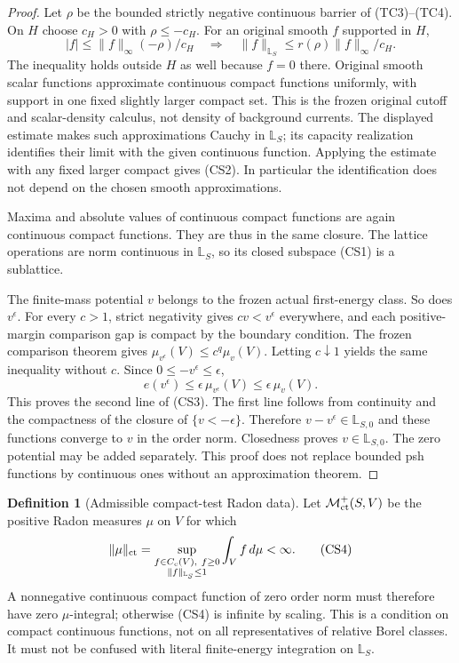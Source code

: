 \documentclass[11pt,a4paper]{article}
\numberwithin{equation}{section}
\theoremstyle{definition}
\newtheorem{definition}[theorem]{Definition}
\theoremstyle{remark}
\begin{document}
\begin{proof}
Let $\rho$ be the bounded strictly negative continuous barrier
of (TC3)--(TC4). On $H$ choose $c_H>0$ with $\rho\leq-c_H$.
For an original smooth $f$ supported in $H$,
\[
 |f|\leq \|f\|_\infty(-\rho)/c_H
 \quad\Longrightarrow\quad
 \|f\|_{\mathbb L_S}\leq r(\rho)\|f\|_\infty/c_H.
\]
The inequality holds outside $H$ as well because $f=0$ there.
Original smooth scalar functions approximate continuous compact
functions uniformly, with support in one fixed slightly larger
compact set. This is the frozen original cutoff and scalar-density
calculus, not density of background currents. The displayed estimate
makes such approximations Cauchy in $\mathbb L_S$; its capacity
realization identifies their limit with the given continuous
function. Applying the estimate with any fixed larger compact
gives (CS2). In particular the identification does not depend on
the chosen smooth approximations.

Maxima and absolute values of continuous compact functions are
again continuous compact functions. They are thus in the same
closure. The lattice operations are norm continuous in
$\mathbb L_S$, so its closed subspace (CS1) is a sublattice.

The finite-mass potential $v$ belongs to the frozen actual
first-energy class. So does $v^\epsilon$. For every $c>1$,
strict negativity gives $cv<v^\epsilon$ everywhere, and each
positive-margin comparison gap is compact by the boundary
condition. The frozen comparison theorem gives
$\mu_{v^\epsilon}(V)\leq c^q\mu_v(V)$. Letting $c\downarrow1$
yields the same inequality without $c$. Since
$0\leq-v^\epsilon\leq\epsilon$,
\[
                e(v^\epsilon)
                     \leq\epsilon\,\mu_{v^\epsilon}(V)
                     \leq\epsilon\,\mu_v(V).
\]
This proves the second line of (CS3). The first line follows from
continuity and the compactness of the closure of
$\{v<-\epsilon\}$. Therefore $v-v^\epsilon\in\mathbb L_{S,0}$
and these functions converge to $v$ in the order norm. Closedness
proves $v\in\mathbb L_{S,0}$. The zero potential may be added
separately. This proof does not replace bounded psh functions
by continuous ones without an approximation theorem.
\end{proof}

\begin{definition}[Admissible compact-test Radon data]
Let $\mathcal M_{\rm ct}^+(S,V)$ be the positive Radon measures
$\mu$ on $V$ for which
\[
 \|\mu\|_{\rm ct}
     =\sup_{\substack{f\in C_c(V),\ f\geq0\\
                         \|f\|_{\mathbb L_S}\leq1}}
                                   \int_V f\,d\mu <\infty.
 \tag{CS4}
\]
A nonnegative continuous compact function of zero order norm must
therefore have zero $\mu$-integral; otherwise (CS4) is infinite
by scaling. This is a condition on compact continuous functions,
not on all representatives of relative Borel classes. It must not
be confused with literal finite-energy integration on
$\mathbb L_S$.
\end{definition}
\end{document}
